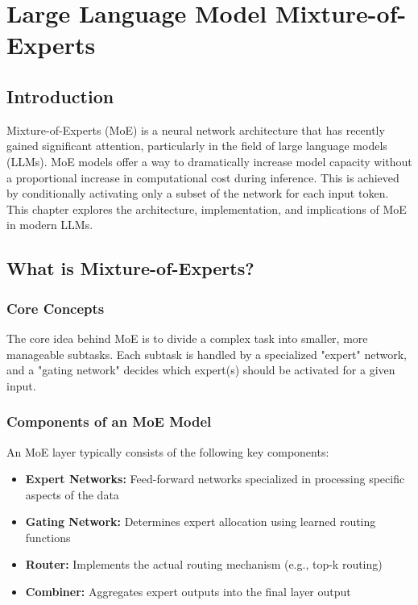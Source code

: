 \chapter{Large Language Model Mixture-of-Experts}
\label{chap:moe}

\section{Introduction}
\noindent
Mixture-of-Experts (MoE) is a neural network architecture that has recently gained significant attention, particularly in the field of large language models (LLMs). MoE models offer a way to dramatically increase model capacity without a proportional increase in computational cost during inference. This is achieved by conditionally activating only a subset of the network for each input token. This chapter explores the architecture, implementation, and implications of MoE in modern LLMs.

\section{What is Mixture-of-Experts?}
\label{sec:moe_basics}

\subsection{Core Concepts}
\noindent
The core idea behind MoE is to divide a complex task into smaller, more manageable subtasks. Each subtask is handled by a specialized "expert" network, and a "gating network" decides which expert(s) should be activated for a given input.

\subsection{Components of an MoE Model}
\noindent
An MoE layer typically consists of the following key components:
\begin{itemize}
    \item \textbf{Expert Networks:} Feed-forward networks specialized in processing specific aspects of the data
    \item \textbf{Gating Network:} Determines expert allocation using learned routing functions
    \item \textbf{Router:} Implements the actual routing mechanism (e.g., top-k routing)
    \item \textbf{Combiner:} Aggregates expert outputs into the final layer output
\end{itemize}

